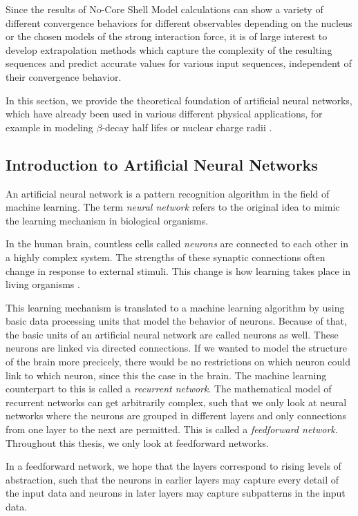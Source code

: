 
Since the results of No-Core Shell Model calculations can show a variety of different convergence behaviors for different observables depending on the nucleus or the chosen models of the strong interaction force, it is of large interest to develop extrapolation methods which capture the complexity of the resulting sequences and predict accurate values for various input sequences, independent of their convergence behavior.

In this section, we provide the theoretical foundation of artificial neural networks, which have already been used in various different physical
applications, for example in modeling $\beta$-decay half lifes \cite{nnbetadecay} or nuclear charge radii \cite{Akkoyun_2013}.

\subsection{Introduction to Artificial Neural Networks}

An artificial neural network is a pattern recognition algorithm in the field of machine learning. The term \textit{neural network} refers to the original idea to mimic the learning mechanism in biological organisms.

In the human brain, countless cells called \textit{neurons} are connected to each other in a highly complex system. The strengths of these synaptic connections often change in response to external stimuli. This change is how learning takes place in living organisms \cite{Aggarwal2018}.

This learning mechanism is translated to a machine learning algorithm by using basic data processing units that model the behavior of neurons. Because of that, the basic units of an artificial neural network are called neurons as well. These neurons are linked via directed connections. If we wanted to model the structure of the brain more precicely, there would be no restrictions on which neuron could link to which neuron, since this the case in the brain. The machine learning counterpart to this is called a \textit{recurrent network}. The mathematical model of recurrent networks can get arbitrarily complex, such that we only look at neural networks where the neurons are grouped in different layers and only connections from one layer to the next are permitted. This is called a \textit{feedforward network}. Throughout this thesis, we only look at feedforward networks.

In a feedforward network, we hope that the layers correspond to rising levels of abstraction, such that the neurons in earlier layers may capture every detail of the input data and neurons in later layers may capture subpatterns in the input data.

